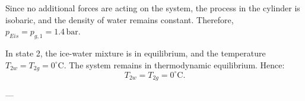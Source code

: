 Since no additional forces are acting on the system, the process in the cylinder is isobaric, and the density of water remains constant. Therefore, \( p_{Eis} = p_{g,1} = 1.4 \, \text{bar} \).  

In state 2, the ice-water mixture is in equilibrium, and the temperature \( T_{2w} = T_{2g} = 0^\circ\text{C} \). The system remains in thermodynamic equilibrium. Hence:  
\[
T_{2w} = T_{2g} = 0^\circ\text{C}.
\]  

---